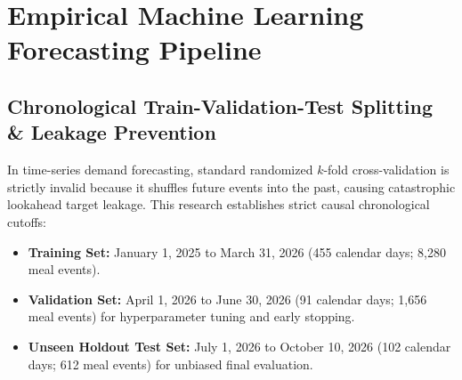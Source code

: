 \documentclass[11pt,a4paper,oneside]{report}
\begin{document}
\chapter{Empirical Machine Learning Forecasting Pipeline}

\section{Chronological Train-Validation-Test Splitting \& Leakage Prevention}
In time-series demand forecasting, standard randomized $k$-fold cross-validation is strictly invalid because it shuffles future events into the past, causing catastrophic lookahead target leakage. This research establishes strict causal chronological cutoffs:
\begin{itemize}
  \item \textbf{Training Set:} January 1, 2025 to March 31, 2026 (455 calendar days; 8,280 meal events).
  \item \textbf{Validation Set:} April 1, 2026 to June 30, 2026 (91 calendar days; 1,656 meal events) for hyperparameter tuning and early stopping.
  \item \textbf{Unseen Holdout Test Set:} July 1, 2026 to October 10, 2026 (102 calendar days; 612 meal events) for unbiased final evaluation.
\end{itemize}
\end{document}
